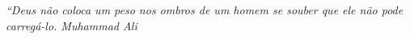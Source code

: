 \begin{epigrafe}
    \vspace*{\fill}
	\begin{flushright}
		\textit{``Deus não coloca um peso nos ombros de um homem se souber que ele não pode carregá-lo. Muhammad Ali}
	\end{flushright}
\end{epigrafe}

